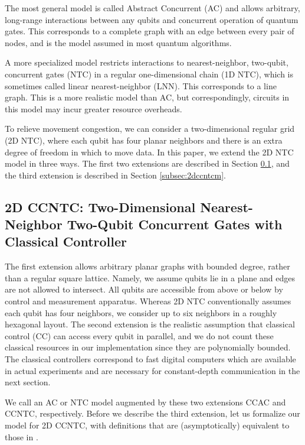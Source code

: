 The most general model is called Abstract Concurrent (\textsc{AC})
and allows arbitrary, long-range interactions between any qubits and concurrent
operation of quantum gates.
This corresponds to a complete graph with an edge between every pair of nodes,
and is the model assumed in most quantum algorithms.

A more specialized model restricts interactions to nearest-neighbor, two-qubit,
concurrent gates (\textsc{NTC}) in a regular one-dimensional chain (1D NTC),
which is sometimes called linear nearest-neighbor (\textsc{LNN}).
This corresponds to a line graph. This is a more realistic model than
\textsc{AC}, but correspondingly, circuits in this model may incur greater
resource overheads.

To relieve movement congestion,
we can consider a two-dimensional regular grid
(2D NTC), where each
qubit has four planar neighbors and 
there is an extra degree of freedom
in which to move data.
In this paper, we extend the \textsc{2D NTC} model in three ways.
The first two extensions are described in Section \ref{subsec:2dccntc},
and the third extension is described in Section \ref{subsec:2dccntcm}.

\subsection{\textsc{2D CCNTC}: Two-Dimensional Nearest-Neighbor Two-Qubit Concurrent Gates with Classical Controller}
\label{subsec:2dccntc}

The first extension allows arbitrary planar graphs
with bounded degree, rather than a regular square lattice.
Namely, we assume qubits lie in a plane and edges are not allowed to intersect.
All qubits are accessible from above
or below by control and measurement apparatus.
Whereas 2D NTC conventionally assumes each qubit
has four neighbors, we consider up to six neighbors in a roughly hexagonal
layout. The second extension is the realistic assumption
that classical control (CC) can
access every qubit in parallel, and we do not count these classical
resources in our implementation since they are polynomially bounded. The
classical controllers
correspond to fast digital computers which are
available in actual experiments and are necessary for constant-depth
communication in the next section.

We call an AC or NTC model augmented by these two extensions
\textsc{CCAC} and \textsc{CCNTC}, respectively. Before we describe the
third extension, let us formalize our model for \textsc{2D CCNTC}, with definitions that are (asymptotically) equivalent to those in 
\cite{Rosenbaum2012}.

